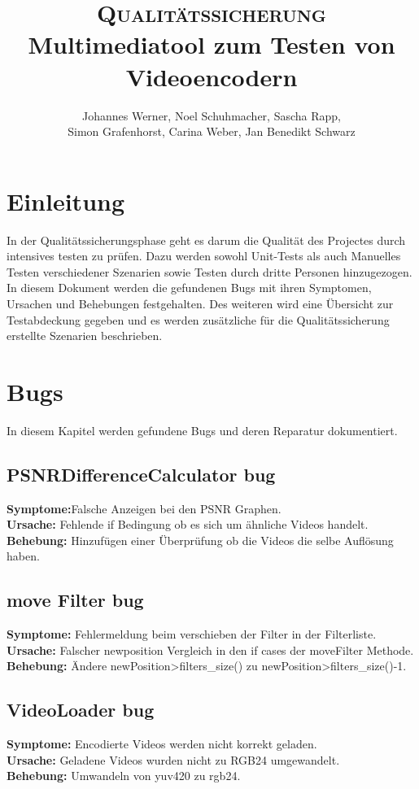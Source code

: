 \documentclass{scrartcl}
\title{\fontsize{40}{48} \selectfont \textsc{Qualitätssicherung}\\
{\fontsize{18}{18} \selectfont Multimediatool zum Testen von Videoencodern}}}
\author {Johannes Werner, Noel Schuhmacher, Sascha Rapp,\\ Simon Grafenhorst,
Carina Weber, Jan Benedikt Schwarz}
\begin{document}
 {
\maketitle
\thispagestyle{empty}
\pagestyle{empty}
\newpage
\setcounter{page}{0}
\tableofcontents
\clearpage
\pagestyle{plain}
\newpage
\section{Einleitung}
In der Qualitätssicherungsphase geht es darum die Qualität des Projectes  durch intensives testen zu prüfen. Dazu werden sowohl Unit-Tests als auch Manuelles Testen verschiedener Szenarien sowie Testen durch dritte Personen hinzugezogen.\\
In diesem Dokument werden die gefundenen Bugs mit ihren Symptomen, Ursachen und Behebungen festgehalten. Des weiteren wird eine Übersicht zur Testabdeckung gegeben und es werden zusätzliche für die Qualitätssicherung erstellte Szenarien beschrieben.


\newpage
\section{Bugs}
In diesem Kapitel werden gefundene Bugs und deren Reparatur dokumentiert.
\subsection{PSNRDifferenceCalculator bug}
\textbf{Symptome:}Falsche Anzeigen bei den PSNR Graphen.\\
\textbf{Ursache:} Fehlende if Bedingung ob es sich um ähnliche Videos handelt.\\
\textbf{Behebung:} Hinzufügen einer Überprüfung ob die Videos die selbe Auflösung haben.
\subsection{move Filter bug}
\textbf{Symptome:} Fehlermeldung beim verschieben der Filter in der Filterliste.\\
\textbf{Ursache:} Falscher newposition Vergleich in den if cases der moveFilter Methode.\\
\textbf{Behebung:} Ändere newPosition>filters\_size() zu newPosition>filters\_size()-1.
\subsection{VideoLoader bug}
\textbf{Symptome:}
Encodierte Videos werden nicht korrekt geladen.\\
\textbf{Ursache:}
Geladene Videos wurden nicht zu RGB24 umgewandelt.\\
\textbf{Behebung:}
Umwandeln von yuv420 zu rgb24.
}
\end{document}
